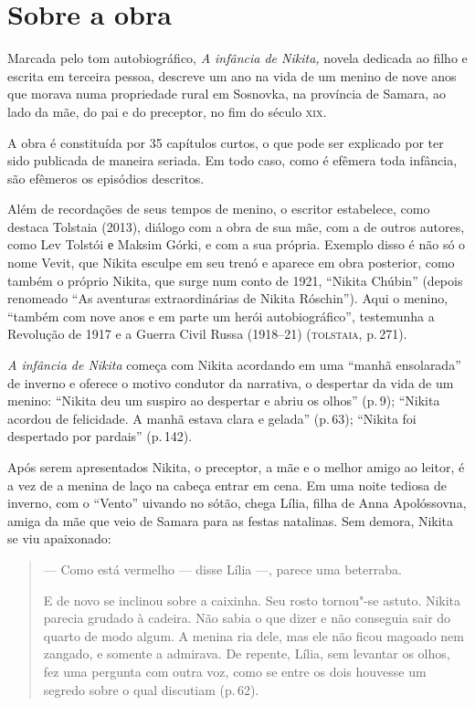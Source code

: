 \section{Sobre a obra}\label{para2}

\noindent{}Marcada pelo tom autobiográfico, \emph{A infância de Nikita,} novela
dedicada ao filho e escrita em terceira pessoa, descreve um ano na vida
de um menino de nove anos que morava numa propriedade rural em Sosnovka,
na província de Samara, ao lado da mãe, do pai e do preceptor, no fim do
século \textsc{xix}.

A obra é constituída por 35 capítulos curtos, o que pode ser explicado
por ter sido publicada de maneira seriada. Em todo caso, como é efêmera
toda infância, são efêmeros os episódios descritos.

Além de recordações de seus tempos de menino, o escritor estabelece,
como destaca Tolstaia (2013), diálogo com a obra de sua mãe, com a de
outros autores, como Lev Tolstói е Maksim Górki, e com a sua própria.
Exemplo disso é não só o nome Vevit, que Nikita esculpe em seu trenó e
aparece em obra posterior, como também o próprio Nikita, que surge num
conto de 1921, ``Nikita Chúbin'' (depois renomeado ``As aventuras
extraordinárias de Nikita Róschin''). Aqui o menino, ``também com nove
anos e em parte um herói autobiográfico'', testemunha a Revolução de
1917 e a Guerra Civil Russa (1918--21) (\textsc{tolstaia}, p.\,271).

\asterisc

\emph{A infância de Nikita} começa com Nikita acordando em uma ``manhã
ensolarada'' de inverno e oferece o motivo condutor da narrativa, o
despertar da vida de um menino: ``Nikita deu um suspiro ao despertar e
abriu os olhos'' (p.\,9); ``Nikita acordou de felicidade. A manhã estava
clara e gelada'' (p.\,63); ``Nikita foi despertado por pardais'' (p.\,142).

Após serem apresentados Nikita, o preceptor, a mãe e o melhor amigo ao
leitor, é a vez de a menina de laço na cabeça entrar em cena. Em uma
noite tediosa de inverno, com o ``Vento'' uivando no sótão, chega Lília,
filha de Anna Apolóssovna, amiga da mãe que veio de Samara para as
festas natalinas. Sem demora, Nikita se viu apaixonado:

\begin{quote}
--- Como está vermelho --- disse Lília ---, parece uma beterraba.

E de novo se inclinou sobre a caixinha. Seu rosto tornou"-se astuto.
Nikita parecia grudado à cadeira. Não sabia o que dizer e não conseguia
sair do quarto de modo algum. A menina ria dele, mas ele não ficou
magoado nem zangado, e somente a admirava. De repente, Lília, sem
levantar os olhos, fez uma pergunta com outra voz, como se entre os dois
houvesse um segredo sobre o qual discutiam (p.\,62).
\end{quote}

